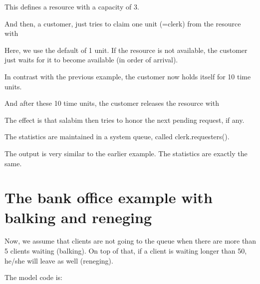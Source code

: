 \documentclass[letterpaper,10pt,english]{sphinxmanual}
\begin{document}
This defines a resource with a capacity of 3.

And then, a customer, just tries to claim one unit (=clerk) from the resource with

%
\begin{sphinxVerbatim}[commandchars=\\\{\}]
 
\end{sphinxVerbatim}

Here, we use the default of 1 unit. If the resource is not available, the customer just
waits for it to become available (in order of arrival).

In contrast with the previous example, the customer now holds itself for 10 time units.

And after these 10 time units, the customer releases the resource with

%
\begin{sphinxVerbatim}[commandchars=\\\{\}]
\end{sphinxVerbatim}

The effect is that salabim then tries to honor the next pending request, if any.

The statistics are maintained in a system queue, called clerk.requesters().

The output is very similar to the earlier example. The statistics are exactly the same.


\section{The bank office example with balking and reneging}
\label{\detokenize{Modeling:the-bank-office-example-with-balking-and-reneging}}
Now, we assume that clients are not going to the queue when there are more than 5 clients
waiting (balking). On top of that, if a client is waiting longer than 50, he/she will
leave as well (reneging).

The model code is:
\end{document}
